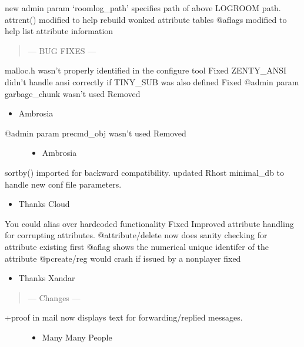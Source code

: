 \documentclass[letterpaper,10pt,english]{sphinxmanual}
\begin{document}
\sphinxAtStartPar
new admin param ‘roomlog\_path’ specifies path of above LOGROOM path.
attrcnt() modified to help rebuild wonked attribute tables
@aflags modified to help list attribute information
\begin{quote}

\sphinxAtStartPar
— BUG FIXES —
\end{quote}

\sphinxAtStartPar
malloc.h wasn’t properly identified in the configure tool \sphinxhyphen{} Fixed
ZENTY\_ANSI didn’t handle ansi correctly if TINY\_SUB was also defined \sphinxhyphen{} Fixed
@admin param garbage\_chunk wasn’t used \sphinxhyphen{} Removed
\begin{itemize}
\item {} 
\sphinxAtStartPar
Ambrosia

\end{itemize}
\begin{description}
\item[{@admin param precmd\_obj wasn’t used \sphinxhyphen{} Removed}] \leavevmode\begin{itemize}
\item {} 
\sphinxAtStartPar
Ambrosia

\end{itemize}

\end{description}

\sphinxAtStartPar
sortby() imported for backward compatibility.
updated Rhost minimal\_db to handle new conf file parameters.
\begin{itemize}
\item {} 
\sphinxAtStartPar
Thanks Cloud

\end{itemize}

\sphinxAtStartPar
You could alias over hardcoded functionality \sphinxhyphen{} Fixed
Improved attribute handling for corrupting attributes.
@attribute/delete now does sanity checking for attribute existing first
@aflag shows the numerical unique identifer of the attribute
@pcreate/reg would crash if issued by a non\sphinxhyphen{}player \sphinxhyphen{} fixed
\begin{itemize}
\item {} 
\sphinxAtStartPar
Thanks Xandar

\end{itemize}
\begin{quote}

\sphinxAtStartPar
—\sphinxhyphen{} Changes —\sphinxhyphen{}
\end{quote}
\begin{description}
\item[{+proof in mail now displays text for forwarding/replied messages.}] \leavevmode\begin{itemize}
\item {} 
\sphinxAtStartPar
Many Many People

\end{itemize}

\end{description}
\end{document}
